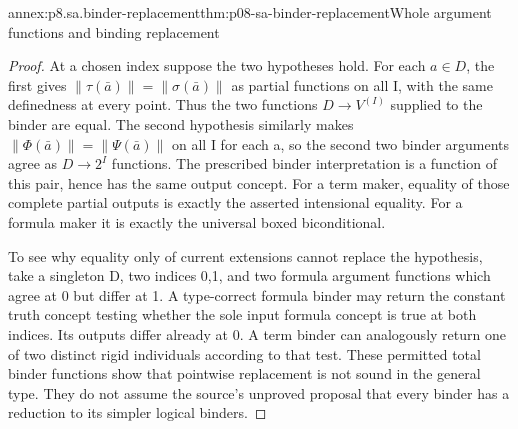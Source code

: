 \begin{annexitem}{annex:p8.sa.binder-replacement}{thm:p08-sa-binder-replacement}{Whole argument functions and binding replacement}
\begin{proof}
At a chosen index suppose the two hypotheses hold. For each
\(a\in D\), the first gives
\(\|\tau(\bar a)\|=\|\sigma(\bar a)\|\) as partial
functions on all I, with the same definedness at every point.
Thus the two functions \(D\to V^{(I)}\) supplied to the
binder are equal. The second hypothesis similarly makes
\(\|\Phi(\bar a)\|=\|\Psi(\bar a)\|\) on all I
for each a, so the second two binder arguments agree as
\(D\to2^I\) functions. The prescribed binder interpretation
is a function of this pair, hence has the same output concept.
For a term maker, equality of those complete partial outputs
is exactly the asserted intensional equality. For a formula
maker it is exactly the universal boxed biconditional.

To see why equality only of current extensions cannot replace
the hypothesis, take a singleton D, two indices 0,1, and two
formula argument functions which agree at 0 but differ at 1.
A type-correct formula binder may return the constant truth
concept testing whether the sole input formula concept is true
at both indices. Its outputs differ already at 0. A term binder
can analogously return one of two distinct rigid individuals
according to that test. These permitted total binder functions
show that pointwise replacement is not sound in the general type.
They do not assume the source's unproved proposal that every
binder has a reduction to its simpler logical binders.
\end{proof}
\end{annexitem}

